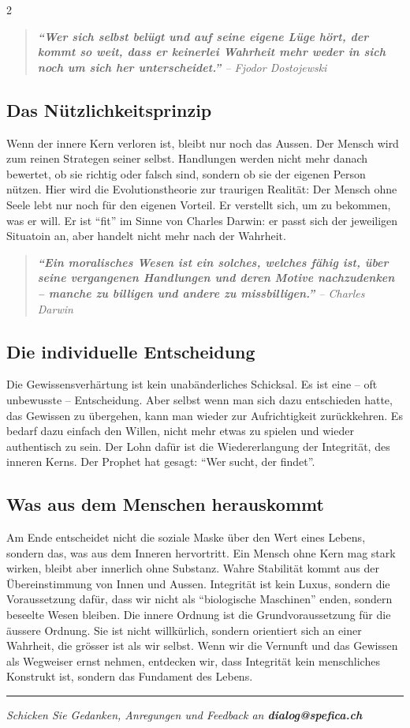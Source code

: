 \documentclass[a4paper,11pt]{article}
\begin{document}
\begin{multicols}{2}
\begin{quote}
  \itshape \textbf{``Wer sich selbst belügt und auf seine eigene Lüge hört, der kommt so weit, dass er keinerlei Wahrheit mehr weder in sich noch um sich her unterscheidet.''} -- Fjodor Dostojewski
\end{quote}
\subsection*{Das Nützlichkeitsprinzip}
Wenn der innere Kern verloren ist, bleibt nur noch das Aussen. Der Mensch wird zum reinen Strategen seiner selbst. Handlungen werden nicht mehr danach bewertet, ob sie richtig oder falsch sind, sondern ob sie der eigenen Person nützen. Hier wird die Evolutionstheorie zur traurigen Realität: Der Mensch ohne Seele lebt nur noch für den eigenen Vorteil. Er verstellt sich, um zu bekommen, was er will. Er ist ``fit'' im Sinne von Charles Darwin: er passt sich der jeweiligen Situatoin an, aber handelt nicht mehr nach der Wahrheit.
\begin{quote}
  \itshape \textbf{``Ein moralisches Wesen ist ein solches, welches fähig ist, über seine vergangenen Handlungen und deren Motive nachzudenken – manche zu billigen und andere zu missbilligen.''} -- Charles Darwin
\end{quote}
\subsection*{Die individuelle Entscheidung}
Die Gewissensverhärtung ist kein unabänderliches Schicksal. Es ist eine -- oft unbewusste -- Entscheidung. Aber selbst wenn man sich dazu entschieden hatte, das Gewissen zu übergehen, kann man wieder zur Aufrichtigkeit zurückkehren. Es bedarf dazu einfach den Willen, nicht mehr etwas zu spielen und wieder authentisch zu sein. Der Lohn dafür ist die Wiedererlangung der Integrität, des inneren Kerns. Der Prophet hat gesagt: ``Wer sucht, der findet''.
\subsection*{Was aus dem Menschen herauskommt}
Am Ende entscheidet nicht die soziale Maske über den Wert eines Lebens, sondern das, was aus dem Inneren hervortritt. Ein Mensch ohne Kern mag stark wirken, bleibt aber innerlich ohne Substanz. Wahre Stabilität kommt aus der Übereinstimmung von Innen und Aussen. Integrität ist kein Luxus, sondern die Voraussetzung dafür, dass wir nicht als ``biologische Maschinen'' enden, sondern beseelte Wesen bleiben. Die innere Ordnung ist die Grundvoraussetzung für die äussere Ordnung. Sie ist nicht willkürlich, sondern orientiert sich an einer Wahrheit, die grösser ist als wir selbst. Wenn wir die Vernunft und das Gewissen als Wegweiser ernst nehmen, entdecken wir, dass Integrität kein menschliches Konstrukt ist, sondern das Fundament des Lebens.

\end{multicols}

\vfill
\hrule

\itshape \centering \color{mediumgrey} Schicken Sie Gedanken, Anregungen und Feedback an \textbf{dialog@spefica.ch}
\end{document}
